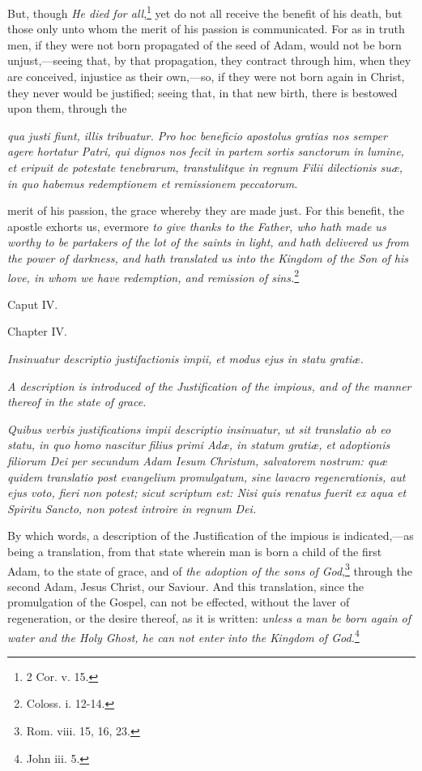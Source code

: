 But, though \emph{He died for all},\footnote{\par   2 Cor. v. 15.} yet do not all receive the benefit of his death, but those only unto whom the merit of his passion is communicated. For as in truth men, if they were not born propagated of the seed of Adam, would not be born unjust,—seeing that, by that propagation, they contract through him, when they are conceived, injustice as their own,—so, if they were not born again in Christ, they never would be justified; seeing that, in that new birth, there is bestowed upon them, through the

\emph{qua justi fiunt, illis tribuatur. Pro hoc beneficio apostolus gratias nos semper agere hortatur Patri, qui dignos nos fecit in partem sortis sanctorum in lumine, et eripuit de potestate tenebrarum, transtulitque in regnum Filii dilectionis suæ, in quo habemus redemptionem et remissionem peccatorum.}

merit of his passion, the grace whereby they are made just. For this benefit, the apostle exhorts us, evermore \emph{to give thanks to the Father, who hath made us worthy to be partakers of the lot of the saints in light, and hath delivered us from the power of darkness, and hath translated us into the Kingdom of the Son of his love, in whom we have redemption, and remission of sins.}\footnote{\par   Coloss. i. 12-14.}

Caput IV.

Chapter IV.

\emph{Insinuatur descriptio justifactionis impii, et modus ejus in statu gratiæ.}

\emph{A description is introduced of the Justification of the impious, and of the manner thereof in the state of grace.}

\emph{Quibus verbis justifications impii descriptio insinuatur, ut sit translatio ab eo statu, in quo homo nascitur filius primi Adæ, in statum gratiæ, et adoptionis filiorum Dei per secundum Adam Iesum Christum, salvatorem nostrum: quæ quidem translatio post evangelium promulgatum, sine lavacro regenerationis, aut ejus voto, fieri non potest; sicut scriptum est: Nisi quis renatus fuerit ex aqua et Spiritu Sancto, non potest introire in regnum Dei.}

By which words, a description of the Justification of the impious is indicated,—as being a translation, from that state wherein man is born a child of the first Adam, to the state of grace, and of \emph{the adoption of the sons of God},\footnote{\par   Rom. viii. 15, 16, 23.} through the second Adam, Jesus Christ, our Saviour. And this translation, since the promulgation of the Gospel, can not be effected, without the laver of regeneration, or the desire thereof, as it is written: \emph{unless a man be born again of water and the Holy Ghost, he can not enter into the Kingdom of God.}\footnote{\par   John iii. 5.}

